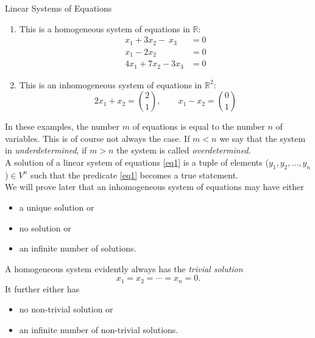 \documentclass[smaller,hyperref={CJKbookmarks=true}]{beamer}
\newcommand{\myseries}[2]{$#1_1,#1_2,\dots,#1_#2$}
\begin{document}
\begin{frame}{Linear Systems of Equations}
\begin{spacing}{0.9}
\begin{enumerate}[1.]
  \item This is a homogeneous system of equations in $\mathbb{R}$:
     \begin{equation*}
       \begin{split}
          x_1+3x_2-~x_3 &=0\\
           x_1-2x_2~~~~~~~ &=0 \\
           4x_1+7x_2-3x_3 &=0
       \end{split}
     \end{equation*}
  \item This is an inhomogeneous system of equations in $\mathbb{R}^2$: \[2x_1+x_2=\binom{2}{1},~~~~~~~~~x_1-x_2=\binom{0}{1}\]
\end{enumerate}
In these examples, the number $m$ of equations is equal to the number $n$ of
variables. This is of course not always the case. If $m<n$ we say that the
system in \textcolor[rgb]{1.00,0.00,0.00}{\emph{underdetermined}}, if $m>n$ the system is called \textcolor[rgb]{1.00,0.00,0.00}{\emph{overdetermined}}.\\[3pt]
A solution of a linear system of equations \eqref{eq1} is a tuple of elements (\myseries{y}{n})$\in V^n$ such that the predicate \eqref{eq1} becomes a true statement.\\[3pt]
We will prove later that an inhomogeneous system of equations may have either
\begin{itemize}
  \item a unique solution or
  \item no solution or
  \item an infinite number of solutions.
\end{itemize}
A homogeneous system evidently always has the \emph{trivial solution} \[x_1=x_2=\cdots=x_n=0.\]
It further either has
\begin{itemize}
  \item no non-trivial solution or
  \item an infinite number of non-trivial solutions.
\end{itemize}
\end{spacing}
\end{frame}
\end{document}
